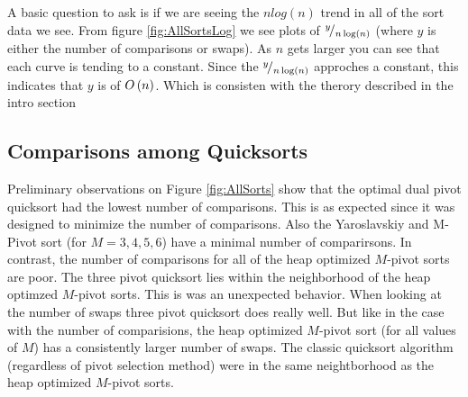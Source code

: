 		A basic question to ask is if we are seeing the $n log(n)$ trend in all of the sort data we see. From figure \ref{fig:AllSortsLog} we see plots of ${}^{y}\!/_{n \log(n)}$ (where $y$ is either the number of comparisons or swaps). As $n$ gets larger you can see that each curve is tending to a constant. Since the ${}^{y}\!/_{n \log(n)}$ approches a constant, this indicates that $y$ is of $O\left(n\right)$. Which is consisten with the therory described in the intro section
		

	\subsection{Comparisons among Quicksorts}
	
		Preliminary observations on Figure \ref{fig:AllSorts} show that the optimal dual pivot quicksort had the lowest number of comparisons. This is as expected since it was designed to minimize the number of comparisons. Also the Yaroslavskiy and M-Pivot sort (for $M=3,4,5,6$) have a minimal number of comparirsons. In contrast, the number of comparisons for all of the heap optimized $M$-pivot sorts are poor. The three pivot quicksort lies within the neighborhood of the heap optimzed $M$-pivot sorts. This is was an unexpected behavior. When looking at the number of swaps three pivot quicksort does really well. But like in the case with the number of comparisions, the heap optimized $M$-pivot sort (for all values of $M$) has a consistently larger number of swaps. The classic quicksort algorithm (regardless of pivot selection method) were in the same neightborhood as the heap optimized $M$-pivot sorts.
		
